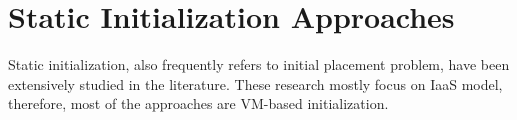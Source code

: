 \section{Static Initialization Approaches}

Static initialization, also frequently refers to initial placement problem, have been extensively 
studied in the literature. These research mostly focus on IaaS model, therefore, most of the approaches are VM-based initialization. 


